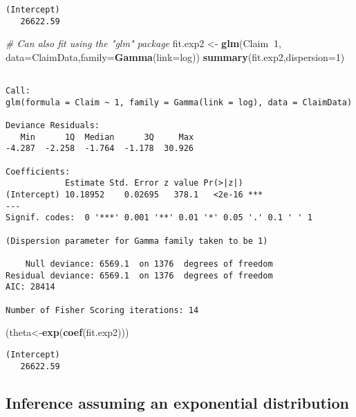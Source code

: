 \documentclass[]{book}
\newenvironment{Shaded}{\begin{snugshade}}{\end{snugshade}}
\newcommand{\KeywordTok}[1]{\textcolor[rgb]{0.13,0.29,0.53}{\textbf{#1}}}
\newcommand{\DataTypeTok}[1]{\textcolor[rgb]{0.13,0.29,0.53}{#1}}
\newcommand{\DecValTok}[1]{\textcolor[rgb]{0.00,0.00,0.81}{#1}}
\newcommand{\StringTok}[1]{\textcolor[rgb]{0.31,0.60,0.02}{#1}}
\newcommand{\CommentTok}[1]{\textcolor[rgb]{0.56,0.35,0.01}{\textit{#1}}}
\newcommand{\OperatorTok}[1]{\textcolor[rgb]{0.81,0.36,0.00}{\textbf{#1}}}
\newcommand{\NormalTok}[1]{#1}
\theoremstyle{definition}
\theoremstyle{definition}
\theoremstyle{definition}
\theoremstyle{remark}
\begin{document}
\begin{verbatim}
(Intercept) 
   26622.59 
\end{verbatim}

\begin{Shaded}
\begin{Highlighting}[]
\CommentTok{# Can also fit using the "glm" package}
\NormalTok{fit.exp2 <-}\StringTok{ }\KeywordTok{glm}\NormalTok{(Claim}\OperatorTok{~}\DecValTok{1}\NormalTok{, }\DataTypeTok{data=}\NormalTok{ClaimData,}\DataTypeTok{family=}\KeywordTok{Gamma}\NormalTok{(}\DataTypeTok{link=}\NormalTok{log)) }
\KeywordTok{summary}\NormalTok{(fit.exp2,}\DataTypeTok{dispersion=}\DecValTok{1}\NormalTok{)}
\end{Highlighting}
\end{Shaded}

\begin{verbatim}

Call:
glm(formula = Claim ~ 1, family = Gamma(link = log), data = ClaimData)

Deviance Residuals: 
   Min      1Q  Median      3Q     Max  
-4.287  -2.258  -1.764  -1.178  30.926  

Coefficients:
            Estimate Std. Error z value Pr(>|z|)    
(Intercept) 10.18952    0.02695   378.1   <2e-16 ***
---
Signif. codes:  0 '***' 0.001 '**' 0.01 '*' 0.05 '.' 0.1 ' ' 1

(Dispersion parameter for Gamma family taken to be 1)

    Null deviance: 6569.1  on 1376  degrees of freedom
Residual deviance: 6569.1  on 1376  degrees of freedom
AIC: 28414

Number of Fisher Scoring iterations: 14
\end{verbatim}

\begin{Shaded}
\begin{Highlighting}[]
\NormalTok{(theta<-}\KeywordTok{exp}\NormalTok{(}\KeywordTok{coef}\NormalTok{(fit.exp2)))  }
\end{Highlighting}
\end{Shaded}

\begin{verbatim}
(Intercept) 
   26622.59 
\end{verbatim}

\subsection{Inference assuming an exponential
distribution}\label{inference-assuming-an-exponential-distribution-1}
\end{document}
